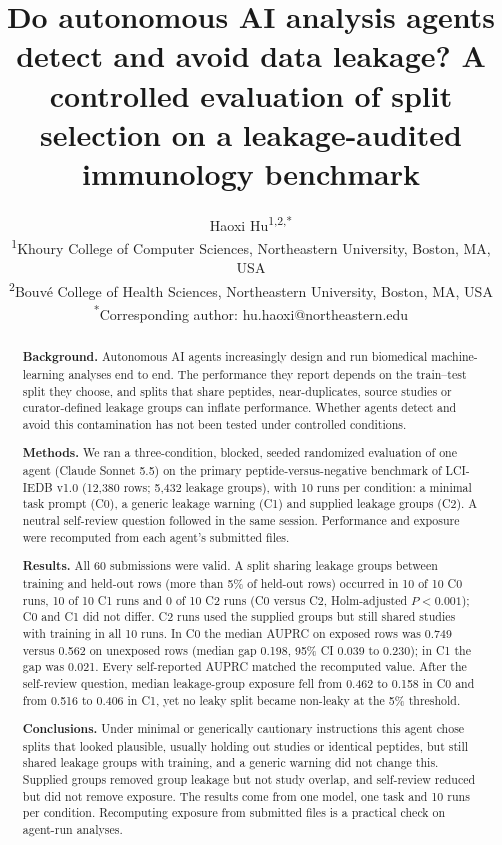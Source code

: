 \documentclass[11pt,a4paper]{article}
\title{Do autonomous AI analysis agents detect and avoid data leakage? A controlled evaluation of split selection on a leakage-audited immunology benchmark}
\author{Haoxi Hu\textsuperscript{1,2,*}\\[2pt]
\small\textsuperscript{1}Khoury College of Computer Sciences, Northeastern University, Boston, MA, USA\\
\small\textsuperscript{2}Bouv\'e College of Health Sciences, Northeastern University, Boston, MA, USA\\
\small\textsuperscript{*}Corresponding author: hu.haoxi@northeastern.edu}
\date{}
\begin{document}
\maketitle

\begin{abstract}
\noindent\textbf{Background.} Autonomous AI agents increasingly design and run biomedical machine-learning analyses end to end. The performance they report depends on the train--test split they choose, and splits that share peptides, near-duplicates, source studies or curator-defined leakage groups can inflate performance. Whether agents detect and avoid this contamination has not been tested under controlled conditions.

\medskip\noindent\textbf{Methods.} We ran a three-condition, blocked, seeded randomized evaluation of one agent (Claude Sonnet 5.5) on the primary peptide-versus-negative benchmark of LCI-IEDB v1.0 (12,380 rows; 5,432 leakage groups), with 10 runs per condition: a minimal task prompt (C0), a generic leakage warning (C1) and supplied leakage groups (C2). A neutral self-review question followed in the same session. Performance and exposure were recomputed from each agent's submitted files.

\medskip\noindent\textbf{Results.} All 60 submissions were valid. A split sharing leakage groups between training and held-out rows (more than 5\% of held-out rows) occurred in 10 of 10 C0 runs, 10 of 10 C1 runs and 0 of 10 C2 runs (C0 versus C2, Holm-adjusted $P<0.001$); C0 and C1 did not differ. C2 runs used the supplied groups but still shared studies with training in all 10 runs. In C0 the median AUPRC on exposed rows was 0.749 versus 0.562 on unexposed rows (median gap 0.198, 95\% CI 0.039 to 0.230); in C1 the gap was 0.021. Every self-reported AUPRC matched the recomputed value. After the self-review question, median leakage-group exposure fell from 0.462 to 0.158 in C0 and from 0.516 to 0.406 in C1, yet no leaky split became non-leaky at the 5\% threshold.

\medskip\noindent\textbf{Conclusions.} Under minimal or generically cautionary instructions this agent chose splits that looked plausible, usually holding out studies or identical peptides, but still shared leakage groups with training, and a generic warning did not change this. Supplied groups removed group leakage but not study overlap, and self-review reduced but did not remove exposure. The results come from one model, one task and 10 runs per condition. Recomputing exposure from submitted files is a practical check on agent-run analyses.
\end{abstract}
\end{document}
